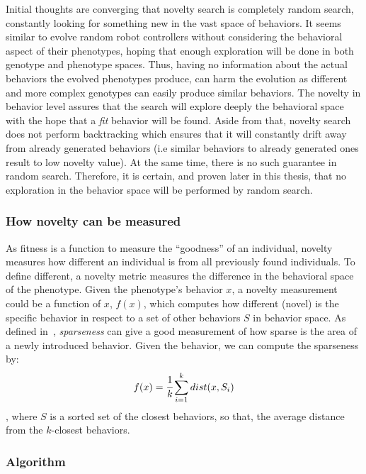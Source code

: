Initial thoughts are converging that novelty search is completely random search, constantly looking for something new in the vast space of behaviors. It seems similar to evolve random robot controllers without considering the behavioral aspect of their phenotypes, hoping that enough exploration will be done in both genotype and phenotype spaces. Thus, having no information about the actual behaviors the evolved phenotypes produce, can harm the evolution as different and more complex genotypes can easily produce similar behaviors. The novelty in behavior level assures that the search will explore deeply the behavioral space with the hope that a \emph{fit} behavior will be found. Aside from that, novelty search does not perform backtracking which ensures that it will constantly drift away from already generated behaviors (i.e similar behaviors to already generated ones result to low novelty value). At the same time, there is no such guarantee in random search. Therefore, it is certain, and proven later in this thesis, that no exploration in the behavior space will be performed by random search.



\subsubsection*{How novelty can be measured}

As fitness is a function to measure the ``goodness'' of an individual, novelty measures how different an individual is from all previously found individuals. To define different, a novelty metric measures the difference in the behavioral space of the phenotype. Given the phenotype's behavior $x$, a novelty measurement could be a function of $x$, $f(x)$, which computes how different (novel) is the specific behavior in respect to a set of other behaviors $S$ in behavior space.  As defined in~\citep{lehman2008exploiting,lehman2011abandoning}, \emph{sparseness} can give a good measurement of how sparse is the area of a newly introduced behavior. Given the behavior, we can compute the sparseness by:
\begin{equation}
\label{sparsenessEquation}
f(x) = \cfrac{1}{k} \sum_{i=1}^{k} dist(x, S_i)
\end{equation}
, where $S$ is a sorted set of the closest behaviors, so that, the average distance from the $k$-closest behaviors.


\subsubsection*{Algorithm}


